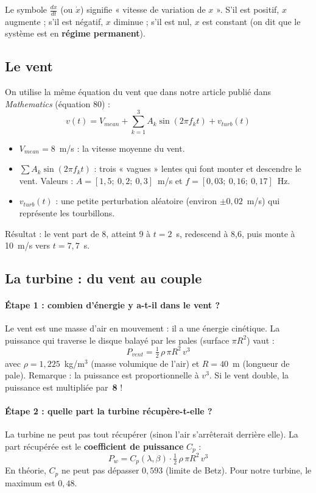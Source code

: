 \documentclass[11pt,a4paper]{article}
\begin{document}
Le symbole $\frac{dx}{dt}$ (ou $\dot x$) signifie « vitesse de variation de $x$ ». S'il est positif,
$x$ augmente ; s'il est négatif, $x$ diminue ; s'il est nul, $x$ est constant (on dit que le système est
en \textbf{régime permanent}).

\subsection{Le vent}
On utilise la même équation du vent que dans notre article publié dans \emph{Mathematics} (équation 80) :
\begin{equation}
v(t) = V_{mean} + \sum_{k=1}^{3} A_k \sin(2\pi f_k t) + v_{turb}(t)
\end{equation}
\begin{itemize}
\item $V_{mean}=8$~m/s : la vitesse moyenne du vent.
\item $\sum A_k\sin(2\pi f_k t)$ : trois « vagues » lentes qui font monter et descendre le vent.
Valeurs : $A=[1{,}5;\ 0{,}2;\ 0{,}3]$~m/s et $f=[0{,}03;\ 0{,}16;\ 0{,}17]$~Hz.
\item $v_{turb}(t)$ : une petite perturbation aléatoire (environ $\pm 0{,}02$~m/s) qui représente les tourbillons.
\end{itemize}
Résultat : le vent part de 8, atteint 9 à $t=2$~s, redescend à 8,6, puis monte à 10~m/s vers $t=7{,}7$~s.

\subsection{La turbine : du vent au couple}

\paragraph{Étape 1 : combien d'énergie y a-t-il dans le vent ?}
Le vent est une masse d'air en mouvement : il a une énergie cinétique. La puissance qui traverse le
disque balayé par les pales (surface $\pi R^2$) vaut :
\begin{equation}
P_{vent} = \tfrac12\,\rho\,\pi R^2\, v^3
\end{equation}
avec $\rho=1{,}225$~kg/m$^3$ (masse volumique de l'air) et $R=40$~m (longueur de pale).
Remarque : la puissance est proportionnelle à $v^3$. Si le vent double, la puissance est multipliée par~\textbf{8} !

\paragraph{Étape 2 : quelle part la turbine récupère-t-elle ?}
La turbine ne peut pas tout récupérer (sinon l'air s'arrêterait derrière elle). La part récupérée est
le \textbf{coefficient de puissance} $C_p$ :
\begin{equation}
P_w = C_p(\lambda,\beta)\cdot \tfrac12\,\rho\,\pi R^2\, v^3
\end{equation}
En théorie, $C_p$ ne peut pas dépasser $0{,}593$ (limite de Betz). Pour notre turbine, le maximum est $0{,}48$.
\end{document}
